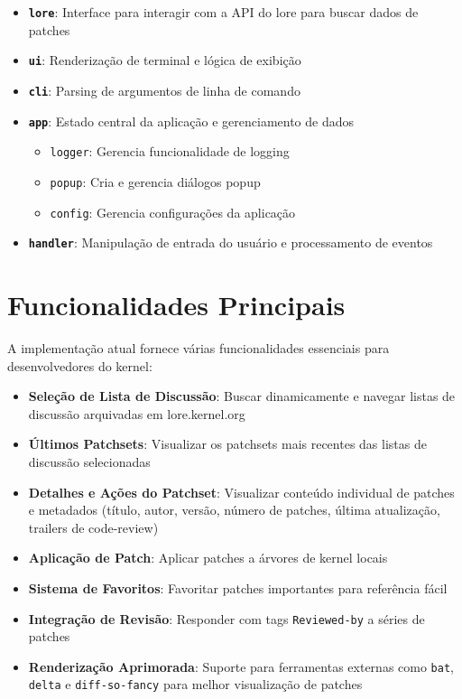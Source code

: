 \begin{itemize}
    \item \textbf{\texttt{lore}}: Interface para interagir com a API do lore para buscar dados de patches
    \item \textbf{\texttt{ui}}: Renderização de terminal e lógica de exibição
    \item \textbf{\texttt{cli}}: Parsing de argumentos de linha de comando
    \item \textbf{\texttt{app}}: Estado central da aplicação e gerenciamento de dados
    \begin{itemize}
        \item \texttt{logger}: Gerencia funcionalidade de logging
        \item \texttt{popup}: Cria e gerencia diálogos popup
        \item \texttt{config}: Gerencia configurações da aplicação
    \end{itemize}
    \item \textbf{\texttt{handler}}: Manipulação de entrada do usuário e processamento de eventos
\end{itemize}

\section{Funcionalidades Principais}

A implementação atual fornece várias funcionalidades essenciais para desenvolvedores do kernel:

\begin{itemize}
    \item \textbf{Seleção de Lista de Discussão}: Buscar dinamicamente e navegar listas de discussão arquivadas em lore.kernel.org
    \item \textbf{Últimos Patchsets}: Visualizar os patchsets mais recentes das listas de discussão selecionadas
    \item \textbf{Detalhes e Ações do Patchset}: Visualizar conteúdo individual de patches e metadados (título, autor, versão, número de patches, última atualização, trailers de code-review)
    \item \textbf{Aplicação de Patch}: Aplicar patches a árvores de kernel locais
    \item \textbf{Sistema de Favoritos}: Favoritar patches importantes para referência fácil
    \item \textbf{Integração de Revisão}: Responder com tags \texttt{Reviewed-by} a séries de patches
    \item \textbf{Renderização Aprimorada}: Suporte para ferramentas externas como \texttt{bat}, \texttt{delta} e \texttt{diff-so-fancy} para melhor visualização de patches
\end{itemize}

